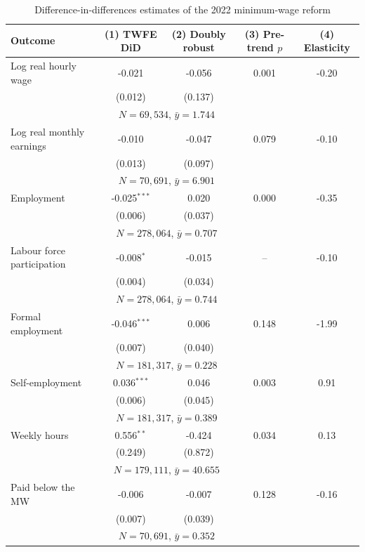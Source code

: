 \begin{table}[!tbp]\centering
\caption{Difference-in-differences estimates of the 2022 minimum-wage reform}\label{tab:main}
\begin{threeparttable}
\begin{tabular}{lcccc}
\toprule
Outcome & (1) TWFE DiD & (2) Doubly robust & (3) Pre-trend $p$ & (4) Elasticity \\
\midrule
Log real hourly wage & -0.021 & -0.056 & 0.001 & -0.20 \\
 & (0.012) & (0.137) & & \\
 & \multicolumn{2}{c}{\footnotesize $N=69,534$, $\bar{y}=1.744$} & & \\
Log real monthly earnings & -0.010 & -0.047 & 0.079 & -0.10 \\
 & (0.013) & (0.097) & & \\
 & \multicolumn{2}{c}{\footnotesize $N=70,691$, $\bar{y}=6.901$} & & \\
Employment & -0.025$^{***}$ & 0.020 & 0.000 & -0.35 \\
 & (0.006) & (0.037) & & \\
 & \multicolumn{2}{c}{\footnotesize $N=278,064$, $\bar{y}=0.707$} & & \\
Labour force participation & -0.008$^{*}$ & -0.015 & -- & -0.10 \\
 & (0.004) & (0.034) & & \\
 & \multicolumn{2}{c}{\footnotesize $N=278,064$, $\bar{y}=0.744$} & & \\
Formal employment & -0.046$^{***}$ & 0.006 & 0.148 & -1.99 \\
 & (0.007) & (0.040) & & \\
 & \multicolumn{2}{c}{\footnotesize $N=181,317$, $\bar{y}=0.228$} & & \\
Self-employment & 0.036$^{***}$ & 0.046 & 0.003 & 0.91 \\
 & (0.006) & (0.045) & & \\
 & \multicolumn{2}{c}{\footnotesize $N=181,317$, $\bar{y}=0.389$} & & \\
Weekly hours & 0.556$^{**}$ & -0.424 & 0.034 & 0.13 \\
 & (0.249) & (0.872) & & \\
 & \multicolumn{2}{c}{\footnotesize $N=179,111$, $\bar{y}=40.655$} & & \\
Paid below the MW & -0.006 & -0.007 & 0.128 & -0.16 \\
 & (0.007) & (0.039) & & \\
 & \multicolumn{2}{c}{\footnotesize $N=70,691$, $\bar{y}=0.352$} & & \\

\end{tabular}
\end{threeparttable}
\end{table}
